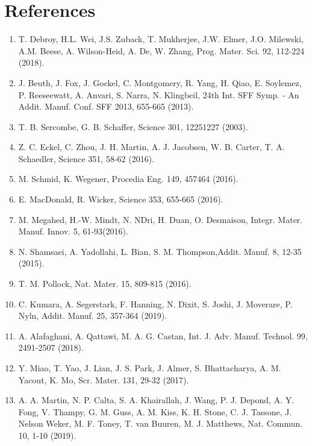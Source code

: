 \documentclass[10pt]{article}
\begin{document}
\section*{References}
\begin{enumerate}
  \item T. Debroy, H.L. Wei, J.S. Zuback, T. Mukherjee, J.W. Elmer, J.O. Milewski, A.M. Beese, A. Wilson-Heid, A. De, W. Zhang, Prog. Mater. Sci. 92, 112-224 (2018).

  \item J. Beuth, J. Fox, J. Gockel, C. Montgomery, R. Yang, H. Qiao, E. Soylemez, P. Reeseewatt, A. Anvari, S. Narra, N. Klingbeil, 24th Int. SFF Symp. - An Addit. Manuf. Conf. SFF 2013, 655-665 (2013).

  \item T. B. Sercombe, G. B. Schaffer, Science 301, 12251227 (2003).

  \item Z. C. Eckel, C. Zhou, J. H. Martin, A. J. Jacobsen, W. B. Carter, T. A. Schaedler, Science 351, 58-62 (2016).

  \item M. Schmid, K. Wegener, Procedia Eng. 149, 457464 (2016).

  \item E. MacDonald, R. Wicker, Science 353, 655-665 (2016).

  \item M. Megahed, H.-W. Mindt, N. NDri, H. Duan, O. Desmaison, Integr. Mater. Manuf. Innov. 5, 61-93(2016).

  \item N. Shamsaei, A. Yadollahi, L. Bian, S. M. Thompson,Addit. Manuf. 8, 12-35 (2015).

  \item T. M. Pollock, Nat. Mater. 15, 809-815 (2016).

  \item C. Kumara, A. Segerstark, F. Hanning, N. Dixit, S. Joshi, J. Moverare, P. Nyln, Addit. Manuf. 25, 357-364 (2019).

  \item A. Alafaghani, A. Qattawi, M. A. G. Castan, Int. J. Adv. Manuf. Technol. 99, 2491-2507 (2018).

  \item Y. Miao, T. Yao, J. Lian, J. S. Park, J. Almer, S. Bhattacharya, A. M. Yacout, K. Mo, Scr. Mater. 131, 29-32 (2017).

  \item A. A. Martin, N. P. Calta, S. A. Khairallah, J. Wang, P. J. Depond, A. Y. Fong, V. Thampy, G. M. Guss, A. M. Kiss, K. H. Stone, C. J. Tassone, J. Nelson Weker, M. F. Toney, T. van Buuren, M. J. Matthews, Nat. Commun. 10, 1-10 (2019).


\end{enumerate}
\end{document}
